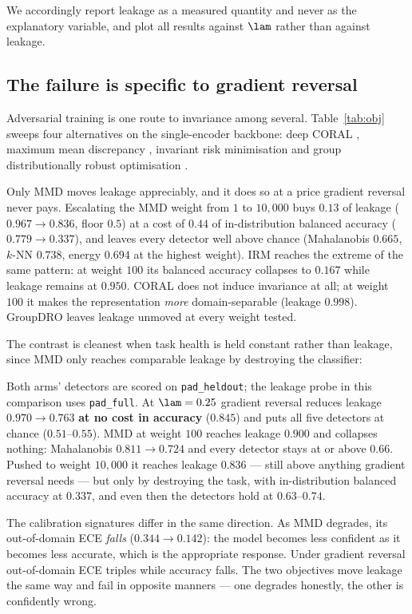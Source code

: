 We accordingly report leakage as a measured quantity and never as the explanatory
variable, and plot all results against $\lam$ rather than against leakage.




\subsection{The failure is specific to gradient reversal}
\label{sec:adversarial}

Adversarial training is one route to invariance among several. Table~\ref{tab:obj}
sweeps four alternatives on the single-encoder backbone: deep CORAL
\cite{sun2016coral}, maximum mean discrepancy \cite{long2015}, invariant risk
minimisation \cite{arjovsky2019} and group distributionally robust optimisation
\cite{sagawa2020}.


Only MMD moves leakage appreciably, and it does so at a price gradient reversal never
pays. Escalating the MMD weight from $1$ to $10{,}000$ buys $0.13$ of leakage
($0.967 \to 0.836$, floor $0.5$) at a cost of $0.44$ of in-distribution balanced
accuracy ($0.779 \to 0.337$), and leaves every detector well above chance
(Mahalanobis $0.665$, $k$-NN $0.738$, energy $0.694$ at the highest weight). IRM
reaches the extreme of the same pattern: at weight $100$ its balanced accuracy collapses
to $0.167$ while leakage remains at $0.950$. CORAL does not induce invariance at all;
at weight $100$ it makes the representation \emph{more} domain-separable
(leakage $0.998$). GroupDRO leaves leakage unmoved at every weight tested.

The contrast is cleanest when task health is held constant rather than leakage, since
MMD only reaches comparable leakage by destroying the classifier:

Both arms' detectors are scored on \texttt{pad\_heldout}; the leakage probe in this
comparison uses \texttt{pad\_full}. At $\lam = 0.25$ gradient reversal reduces leakage
$0.970 \to 0.763$ \textbf{at no cost in accuracy} ($0.845$) and puts
all five detectors at chance ($0.51$--$0.55$). MMD at weight $100$ reaches leakage
$0.900$ and collapses nothing: Mahalanobis $0.811 \to 0.724$ and every detector stays
at or above $0.66$. Pushed to weight $10{,}000$ it reaches leakage $0.836$ --- still
above anything gradient reversal needs --- but only by destroying the task, with
in-distribution balanced accuracy at $0.337$, and even then the detectors hold at
$0.63$--$0.74$.

The calibration signatures differ in the same direction. As MMD degrades, its
out-of-domain ECE \emph{falls} ($0.344 \to 0.142$): the model becomes less confident as
it becomes less accurate, which is the appropriate response. Under gradient reversal
out-of-domain ECE triples while accuracy falls. The two objectives move leakage the same
way and fail in opposite manners --- one degrades honestly, the other is confidently
wrong.

